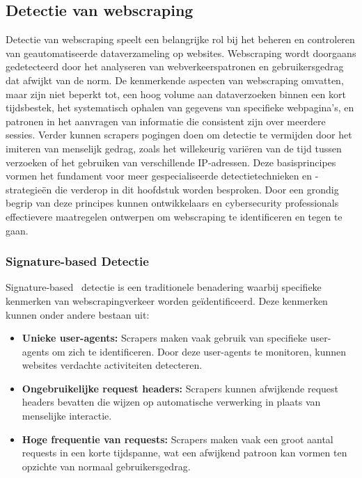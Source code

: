 \subsection{Detectie van webscraping}
Detectie van webscraping speelt een belangrijke rol bij het beheren en controleren van geautomatiseerde dataverzameling op websites. Webscraping wordt doorgaans gedetecteerd door het analyseren van webverkeerspatronen en gebruikersgedrag dat afwijkt van de norm. De kenmerkende aspecten van webscraping omvatten, maar zijn niet beperkt tot, een hoog volume aan dataverzoeken binnen een kort tijdsbestek, het systematisch ophalen van gegevens van specifieke webpagina's, en patronen in het aanvragen van informatie die consistent zijn over meerdere sessies. Verder kunnen scrapers pogingen doen om detectie te vermijden door het imiteren van menselijk gedrag, zoals het willekeurig variëren van de tijd tussen verzoeken of het gebruiken van verschillende IP-adressen.
Deze basisprincipes vormen het fundament voor meer gespecialiseerde detectietechnieken en -strategieën die verderop in dit hoofdstuk worden besproken. Door een grondig begrip van deze principes kunnen ontwikkelaars en cybersecurity professionals effectievere maatregelen ontwerpen om webscraping te identificeren en tegen te gaan.

\subsubsection{Signature-based Detectie}
Signature-based~\autocite{Vastel2023} detectie is een traditionele benadering waarbij specifieke kenmerken van webscrapingverkeer worden geïdentificeerd. Deze kenmerken kunnen onder andere bestaan uit:
\begin{itemize}
    \item \textbf{Unieke user-agents: } Scrapers maken vaak gebruik van specifieke user-agents om zich te identificeren. Door deze user-agents te monitoren, kunnen websites verdachte activiteiten detecteren.

    \item \textbf{Ongebruikelijke request headers: }Scrapers kunnen afwijkende request headers bevatten die wijzen op automatische verwerking in plaats van menselijke interactie.

    \item \textbf{Hoge frequentie van requests: }Scrapers maken vaak een groot aantal requests in een korte tijdspanne, wat een afwijkend patroon kan vormen ten opzichte van normaal gebruikersgedrag.
\end{itemize}

